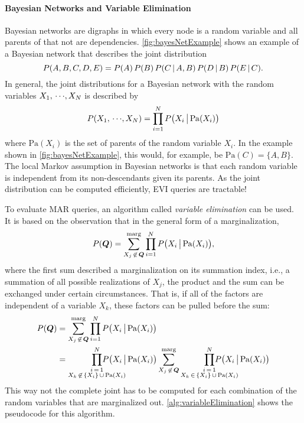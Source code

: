 				\paragraph{Bayesian Networks and Variable Elimination}
					Bayesian networks are digraphs in which every node is a random variable and all parents of that not are dependencies. \autoref{fig:bayesNetExample} shows an example of a Bayesian network that describes the joint distribution
					\begin{equation}
						P(A, B, C, D, E) = P(A) \, P(B) \, P(C \,\vert\, A, B) \, P(D \,\vert\, B) \, P(E \,\vert\, C).
					\end{equation}
					In general, the joint distributions for a Bayesian network with the random variables \( X_1,\,\cdots\!,X_N \) is described by
					\begin{equation}
						P(X_1,\,\cdots\!,X_N) = \prod_{i = 1}^{N} P\big( X_i \,\big\vert\, \mathrm{Pa}(X_i) \big)
					\end{equation}
					where \( \mathrm{Pa}(X_i) \) is the set of parents of the random variable \( X_i \). In the example shown in \autoref{fig:bayesNetExample}, this would, for example, be \( \mathrm{Pa}(C) = \{ A, B \} \). The local Markov assumption in Bayesian networks is that each random variable is independent from its non-descendants given its parents. As the joint distribution can be computed efficiently, EVI queries are tractable!

					To evaluate MAR queries, an algorithm called \emph{variable elimination} can be used. It is based on the observation that in the general form of a marginalization,
					\begin{equation}
						P(\bm{Q}) = \sum_{X_j \,\not\in\, \bm{Q}}^{\text{marg}} \prod_{i = 1}^{N} P\big( X_i \,\big\vert\, \mathrm{Pa}(X_i) \big),
					\end{equation}
					where the first sum described a marginalization on its summation index, i.e., a summation of all possible realizations of \(X_j\), the product and the sum can be exchanged under certain circumstances. That is, if all of the factors are independent of a variable \(X_k\), these factors can be pulled before the sum:
					\begin{align}
						P(\vec{Q})
						 & = \sum_{X_j \,\not\in\, \vec{Q}}^{\text{marg}} \prod_{i = 1}^{N} P\big( X_i \biggiven \mathrm{Pa}(X_i) \big) \\
						 & = \prod_{\substack{i \,=\, 1                                                                                 \\ X_k \,\not\in\, \{ X_i \} \,\cup\, \mathrm{Pa}(X_i)}}^{N} \hspace{-1.06cm} P\big( X_i \biggiven \mathrm{Pa}(X_i) \big) \sum_{X_j \,\not\in\, \vec{Q}}^{\text{marg}} \prod_{\substack{i \,=\, 1 \\ X_k \,\in\, \{ X_i \} \,\cup\, \mathrm{Pa}(X_i)}}^{N} \hspace{-1.06cm} P\big( X_i \biggiven \mathrm{Pa}(X_i) \big)
					\end{align}
					This way not the complete joint has to be computed for each combination of the random variables that are marginalized out. \autoref{alg:variableElimination} shows the pseudocode for this algorithm.

